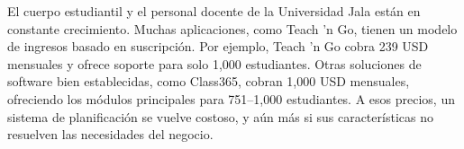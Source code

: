 El cuerpo estudiantil y el personal docente de la Universidad Jala están en constante crecimiento.
Muchas aplicaciones, como Teach 'n Go, tienen un modelo de ingresos basado en suscripción. Por ejemplo, Teach 'n Go cobra 239 USD mensuales y ofrece soporte para solo 1,000 estudiantes. Otras soluciones de software bien establecidas, como Class365, cobran 1,000 USD mensuales, ofreciendo los módulos principales para 751–1,000 estudiantes. A esos precios, un sistema de planificación se vuelve costoso, y aún más si sus características no resuelven las necesidades del negocio.
